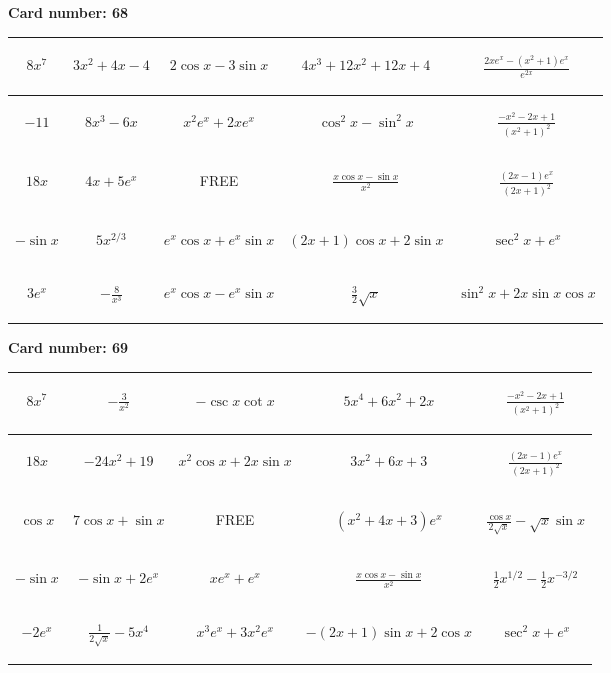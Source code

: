 \documentclass{article}
\newcommand{\entry}[1]{\begin{minipage}[t][2.75cm][t]{4cm} \vspace{1cm} \begin{center}#1\end{center} \end{minipage}}
\newcommand{\freespace}{\entry{FREE}}
\newcommand{\cardnumber}[1]{\noindent \textbf{Card number: #1} \bigskip}
\begin{document}
\pagebreak

\cardnumber{68}
\begin{center}
\begin{tabular}{|*{5}{c|}}
    \hline
    \entry{$8x^7$} & \entry{$3x^2 + 4x - 4$} & \entry{$2 \cos x - 3 \sin x$} & \entry{$4x^3 + 12x^2 + 12x + 4$} & \entry{$\frac{2x e^x - (x^2 + 1) e^x}{e^{2x}}$} \\ \hline
    \entry{$-11$} & \entry{$8x^3 - 6x$} & \entry{$x^2 e^x + 2x e^x$} & \entry{$\cos^2 x - \sin^2 x$} & \entry{$\frac{-x^2 - 2x + 1}{(x^2 + 1)^2}$} \\ \hline
    \entry{$18x$} & \entry{$4x + 5e^x$} & \freespace & \entry{$\frac{x \cos x - \sin x}{x^2}$} & \entry{$\frac{(2x - 1) e^x}{(2x + 1)^2}$} \\ \hline
    \entry{$-\sin x$} & \entry{$5x^{2/3}$} & \entry{$e^x \cos x + e^x \sin x$} & \entry{$(2x + 1) \cos x + 2 \sin x$} & \entry{$\sec^2 x + e^x$} \\ \hline
    \entry{$3e^x$} & \entry{$-\frac{8}{x^3}$} & \entry{$e^x \cos x - e^x \sin x$} & \entry{$\frac{3}{2} \sqrt{x}$} & \entry{$\sin^2 x + 2x \sin x \cos x$} \\ \hline
\end{tabular}
\end{center}

\pagebreak

\cardnumber{69}
\begin{center}
\begin{tabular}{|*{5}{c|}}
    \hline
    \entry{$8x^7$} & \entry{$-\frac{3}{x^2}$} & \entry{$-\csc x \cot x$} & \entry{$5x^4 + 6x^2 + 2x$} & \entry{$\frac{-x^2 - 2x + 1}{(x^2 + 1)^2}$} \\ \hline
    \entry{$18x$} & \entry{$-24x^2 + 19$} & \entry{$x^2 \cos x + 2x \sin x$} & \entry{$3x^2 + 6x + 3$} & \entry{$\frac{(2x - 1) e^x}{(2x + 1)^2}$} \\ \hline
    \entry{$\cos x$} & \entry{$7 \cos x + \sin x$} & \freespace & \entry{$(x^2 + 4x + 3) e^x$} & \entry{$\frac{\cos x}{2 \sqrt{x}} - \sqrt{x} \sin x$} \\ \hline
    \entry{$-\sin x$} & \entry{$-\sin x + 2e^x$} & \entry{$x e^x + e^x$} & \entry{$\frac{x \cos x - \sin x}{x^2}$} & \entry{$\frac{1}{2} x^{1/2} - \frac{1}{2} x^{-3/2}$} \\ \hline
    \entry{$-2e^x$} & \entry{$\frac{1}{2\sqrt{x}} - 5x^4$} & \entry{$x^3 e^x + 3x^2 e^x$} & \entry{$-(2x + 1) \sin x + 2 \cos x$} & \entry{$\sec^2 x + e^x$} \\ \hline
\end{tabular}
\end{center}
\end{document}
